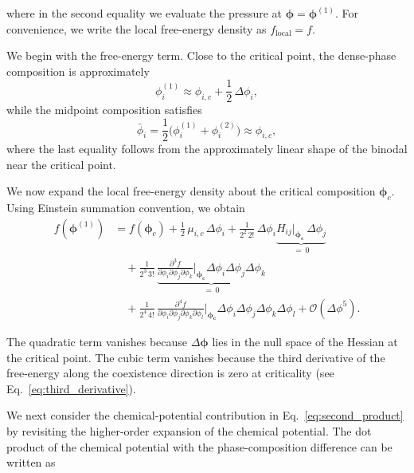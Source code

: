 \documentclass[12pt]{article}
\begin{document}
where in the second equality we evaluate the pressure at $\boldsymbol \phi = \boldsymbol \phi^{(1)}$.
For convenience, we write the local free-energy density as $f_\mathrm{local} = f$.

We begin with the free-energy term. Close to the critical point, the dense-phase composition is approximately
\[
    \phi_i^{(1)} \approx \phi_{i,c} + \frac{1}{2}\,\Delta \phi_i,
\]
while the midpoint composition satisfies
\[
    \bar{\phi}_i
    =
    \frac{1}{2}\bigl(\phi_i^{(1)} + \phi_i^{(2)}\bigr)
    \approx
    \phi_{i,c},
\]
where the last equality follows from the approximately linear shape of the binodal near the critical point.

We now expand the local free-energy density about the critical composition
$\boldsymbol{\phi}_c$. Using Einstein summation convention, we obtain
\begin{equation}
    \begin{split}
        f(\boldsymbol{\phi}^{(1)})
        &=
        f(\boldsymbol{\phi}_c)
        + \frac{1}{2}\,\mu_{i,c}\,\Delta \phi_i
        + \frac{1}{2^2\,2!}\,
        \Delta \phi_i \underbrace{H_{ij}\bigg\rvert_{\boldsymbol{\phi_c}}\,\Delta \phi_j}_{=\,0} \\
        &\quad
        + \frac{1}{2^3\,3!}\,
        \underbrace{
        \frac{\partial^3 f}{\partial \phi_i \partial \phi_j \partial \phi_k}\bigg\rvert_{\boldsymbol{\phi_c}}
        \Delta \phi_i \Delta \phi_j \Delta \phi_k
        }_{=\,0} \\
        &\quad
        + \frac{1}{2^4\,4!}\,
        \frac{\partial^4 f}{\partial \phi_i \partial \phi_j \partial \phi_k \partial \phi_l}\bigg\rvert_{\boldsymbol{\phi_c}}
        \Delta \phi_i \Delta \phi_j \Delta \phi_k \Delta \phi_l
        + \mathcal{O}(\Delta \phi^5).
    \end{split}
\label{eq:free_en_taylor}
\end{equation}

The quadratic term vanishes because $\Delta \boldsymbol{\phi}$ lies in the null space
of the Hessian at the critical point. The cubic term vanishes because the third
derivative of the free-energy along the coexistence direction is zero at criticality (see Eq.~\eqref{eq:third_derivative}).



We next consider the chemical-potential contribution in Eq.~\eqref{eq:second_product} by revisiting the higher-order expansion of the chemical potential.
The dot product of the chemical potential with the phase-composition difference can be written as
\end{document}
